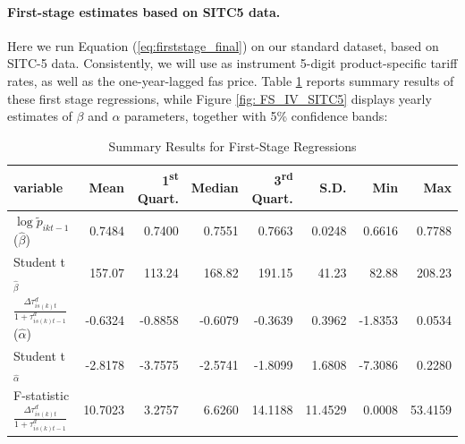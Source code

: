 \documentclass[a4paper,11pt]{article}
\begin{document}
\paragraph{First-stage estimates based on SITC5 data.}

Here we run Equation (\ref{eq:firststage_final}) on our standard dataset, based on SITC-5 data. Consistently, we will use as instrument 5-digit product-specific tariff rates, as well as the one-year-lagged fas price. Table \ref{tab: FS_sitc5} reports summary results of these first stage regressions, while Figure \ref{fig: FS_IV_SITC5} displays yearly estimates of $\beta$ and $\alpha$ parameters, together with 5\% confidence bands:


\begin{table}[htbp]\centering
\caption{Summary Results for First-Stage Regressions\label{tab: FS_sitc5}}
\begin{tabular} {@{} l r r r r r r r @{}} \\ \hline
\textbf{variable } & \textbf{Mean} & \textbf{1\textsuperscript{st} Quart.} & \textbf{Median} & \textbf{3\textsuperscript{rd} Quart.} & \textbf{ S.D.} & \textbf{Min} & \textbf{Max} \\
\hline
 $\log \widetilde{p}_{ikt-1}$ ($\widehat{\beta}$)&     0.7484 &     0.7400 &     0.7551 &     0.7663 &     0.0248 &     0.6616 &     0.7788 \\
Student t$_{\widehat{\beta}}$  &   157.07 &   113.24 &   168.82 &   191.15 &    41.23 &    82.88 &   208.23 \\
$\frac{\Delta \tau^d_{is(k)t}}{1+\tau_{is(k)t-1}^d}$ ($\widehat{\alpha}$)  &    -0.6324 &    -0.8858 &    -0.6079 &    -0.3639 &     0.3962 &    -1.8353 &     0.0534 \\
 Student t$_{\widehat{\alpha}}$  &    -2.8178 &    -3.7575 &    -2.5741 &    -1.8099 &     1.6808 &    -7.3086 &     0.2280 \\
  F-statistic $\frac{\Delta \tau^d_{is(k)t}}{1+\tau_{is(k)t-1}^d}$  &    10.7023 &     3.2757 &     6.6260 &    14.1188 &    11.4529 &     0.0008 &    53.4159 \\
\hline
\end{tabular}
\end{table}
\end{document}
